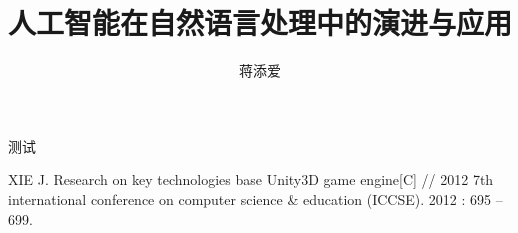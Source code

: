 \documentclass[]{SASSTeX}
\title{人工智能在自然语言处理中的演进与应用}
\author{蒋添爱}
\begin{document}
\MakeTitle[]

测试\cite{xie2012research}

XIE J. Research on key technologies base Unity3D game engine[C] // 2012 7th international conference on computer science & education (ICCSE). 2012 : 695 – 699.


\end{document}

